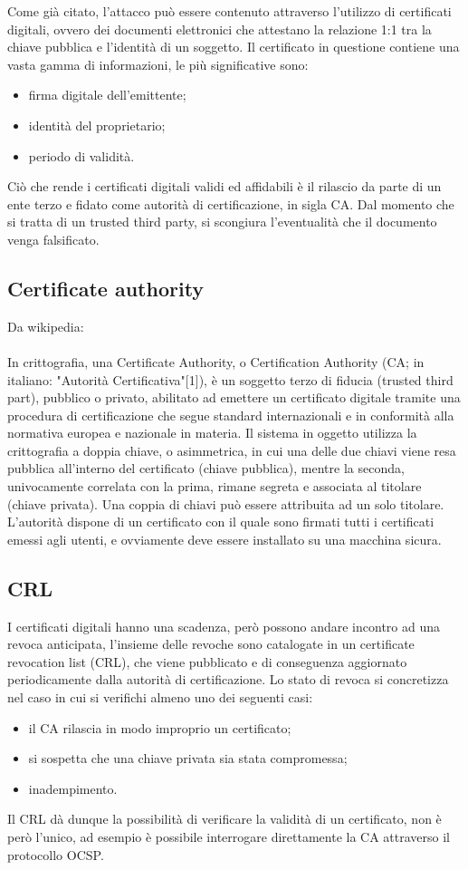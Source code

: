 Come già citato, l'attacco può essere contenuto attraverso l'utilizzo di certificati digitali, ovvero dei documenti elettronici che attestano la relazione 1:1 tra la chiave pubblica e l'identità di un soggetto. Il certificato in questione contiene una vasta gamma di informazioni, le più significative sono: 
\begin{itemize}
	\item firma digitale dell'emittente;
	\item identità del proprietario;
	\item periodo di validità.
\end{itemize}
Ciò che rende i certificati digitali validi ed affidabili è il rilascio da parte di un ente terzo e fidato come autorità di certificazione, in sigla CA. Dal momento che si tratta di un trusted third party, si scongiura l'eventualità che il documento venga falsificato.

\subsection{Certificate authority}
Da wikipedia: \\\\
In crittografia, una Certificate Authority, o Certification Authority (CA; in italiano: "Autorità Certificativa"[1]), è un soggetto terzo di fiducia (trusted third part), pubblico o privato, abilitato ad emettere un certificato digitale tramite una procedura di certificazione che segue standard internazionali e in conformità alla normativa europea e nazionale in materia.
Il sistema in oggetto utilizza la crittografia a doppia chiave, o asimmetrica, in cui una delle due chiavi viene resa pubblica all'interno del certificato (chiave pubblica), mentre la seconda, univocamente correlata con la prima, rimane segreta e associata al titolare (chiave privata). Una coppia di chiavi può essere attribuita ad un solo titolare. L'autorità dispone di un certificato con il quale sono firmati tutti i certificati emessi agli utenti, e ovviamente deve essere installato su una macchina sicura.

\subsection{CRL}

I certificati digitali hanno una scadenza, però possono andare incontro ad una revoca anticipata, l'insieme delle revoche sono catalogate in un certificate revocation list (CRL), che viene pubblicato e di conseguenza aggiornato periodicamente dalla autorità di certificazione. Lo stato di revoca si concretizza nel caso in cui si verifichi almeno uno dei seguenti casi:
\begin{itemize}
	\item il CA rilascia in modo improprio un certificato;
	\item si sospetta che una chiave privata sia stata compromessa;
	\item inadempimento.
\end{itemize}
Il CRL dà dunque la possibilità di verificare la validità di un certificato, non è però l'unico, ad esempio è possibile interrogare direttamente la CA attraverso il protocollo OCSP.
